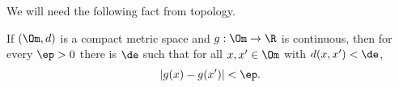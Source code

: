 We will need the following fact from topology.
\begin{lem}\label{lem:unif-cont}
If $(\Om,d)$ is a compact metric space and $g:\Om\to \R$ is continuous, then for every $\ep>0$ there is $\de$ such that for all $x,x'\in \Om$ with $d(x,x')<\de$, 
$$|g(x)-g(x')|<\ep.$$
\end{lem}

